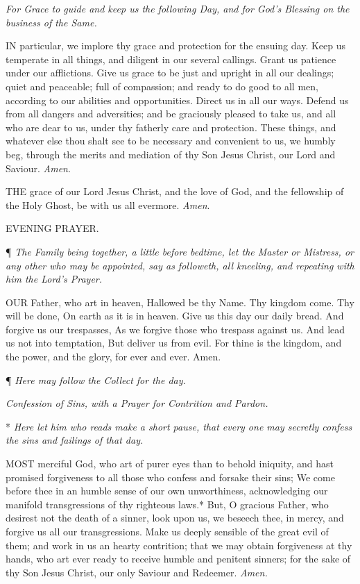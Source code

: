 \emph{For Grace to guide and keep us the following Day, and for God’s Blessing on the business of the Same.}

IN particular, we implore
thy grace and protection for the ensuing day. Keep us temperate in all
things, and diligent in our several callings. Grant us patience under
our afflictions. Give us grace to be just and upright in all our dealings;
quiet and peaceable; full of compassion; and ready to do good to all men,
according to our abilities and opportunities. Direct us in all our ways.
Defend us from all dangers and adversities; and be graciously pleased
to take us, and all who are dear to us, under thy fatherly care and protection.
These things, and whatever else thou shalt see to be necessary and convenient
to us, we humbly beg, through the merits and mediation of thy Son Jesus
Christ, our Lord and Saviour. \emph{Amen}.

THE grace of our Lord Jesus
Christ, and the love of God, and the fellowship of the Holy Ghost, be
with us all evermore. \emph{Amen}.

EVENING PRAYER.

¶
\emph{The Family being together, a little before bedtime, let the Master
or Mistress, or any other who may be appointed, say as followeth, all
kneeling, and repeating with him the Lord's Prayer.}

OUR
Father, who art in heaven, Hallowed be thy Name. Thy kingdom come. Thy
will be done, On earth as it is in heaven. Give us this day our daily
bread. And forgive us our trespasses, As we forgive those who trespass
against us. And lead us not into temptation, But deliver us from evil.
For thine is the kingdom, and the power, and the glory, for ever and ever.
Amen.

¶
\emph{Here may follow the Collect for the day.}

\emph{Confession
of Sins, with a Prayer for Contrition and Pardon.}

* \emph{Here
let him who reads make a short pause, that every one may secretly
confess the sins and failings of that day.}

MOST
merciful God, who art of purer eyes than to behold iniquity, and hast
promised forgiveness to all those who confess and forsake their sins;
We come before thee in an humble sense of our own unworthiness, acknowledging
our manifold transgressions of thy righteous laws.* But, O gracious Father,
who desirest not the death of a sinner, look upon us, we beseech thee,
in mercy, and forgive us all our transgressions. Make us deeply sensible
of the great evil of them; and work in us an hearty contrition; that we
may obtain forgiveness at thy hands, who art ever ready to receive humble
and penitent sinners; for the sake of thy Son Jesus Christ, our only Saviour
and Redeemer. \emph{Amen.}

